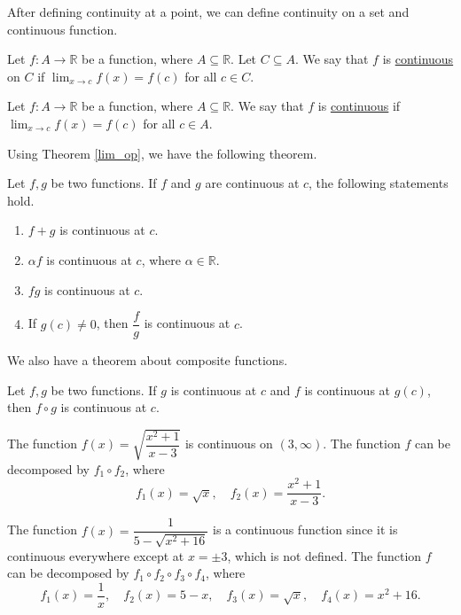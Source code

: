 \documentclass[11pt]{book}
\theoremstyle{break}
\theoremstyle{no_label}
\newcommand{\bbR}{\mathbb{R}}
\numberwithin{equation}{section}
\begin{document}
After defining continuity at a point, we can define continuity on a set and continuous function.

\begin{definition}[Continuous]
    Let $f:A\to\bbR$ be a function, where $A\subseteq\bbR$. Let $C\subseteq A$. We say that $f$ is \underline{continuous} on $C$ if $\displaystyle\lim_{x\to c}f(x)=f(c)$ for all $c\in C$.
\end{definition}

\begin{definition}[Continuous]
    Let $f:A\to\bbR$ be a function, where $A\subseteq\bbR$. We say that $f$ is \underline{continuous} if $\displaystyle\lim_{x\to c}f(x)=f(c)$ for all $c\in A$.
\end{definition}

Using Theorem \ref{lim_op}, we have the following theorem.

\begin{theorem}
    Let $f, g$ be two functions. If $f$ and $g$ are continuous at $c$, the following statements hold.
    \begin{enumerate}
        \item $f+g$ is continuous at $c$.
        \item $\alpha f$ is continuous at $c$, where $\alpha\in\bbR$.
        \item $fg$ is continuous at $c$.
        \item If $g(c)\ne0$, then $\dfrac{f}{g}$ is continuous at $c$.
    \end{enumerate}
\end{theorem}

We also have a theorem about composite functions.

\begin{theorem}
    Let $f, g$ be two functions. If $g$ is continuous at $c$ and $f$ is continuous at $g(c)$, then $f\circ g$ is continuous at $c$.
\end{theorem}

\begin{example} 
    The function $f(x)=\sqrt{\dfrac{x^2+1}{x-3}}$ is continuous on $(3, \infty)$. The function $f$ can be decomposed by $f_1\circ f_2$, where \begin{equation*}
        f_1(x)=\sqrt{x},\quad f_2(x)=\dfrac{x^2+1}{x-3}.
    \end{equation*}
\end{example}

\begin{example} 
    The function $f(x)=\dfrac{1}{5-\sqrt{x^2+16}}$ is a continuous function since it is continuous everywhere except at $x=\pm3$, which is not defined. The function $f$ can be decomposed by $f_1\circ f_2\circ f_3\circ f_4$, where \begin{equation*}
        f_1(x)=\dfrac{1}{x}, \quad f_2(x)=5-x, \quad f_3(x)=\sqrt{x}, \quad f_4(x)=x^2+16.
    \end{equation*}
\end{example}
\end{document}
